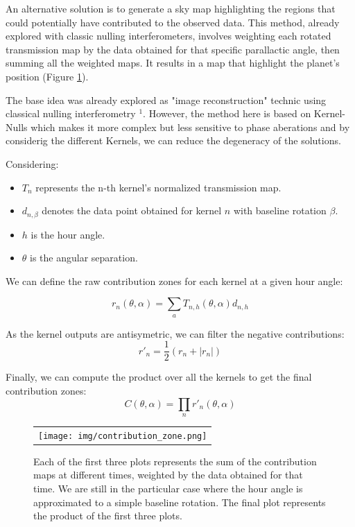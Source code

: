 \documentclass[]{spie}  %
\begin{document}
An alternative solution is to generate a sky map highlighting the regions that could potentially have contributed to the observed data. This method, already explored with classic nulling interferometers\cite{Image reconstruction}, involves weighting each rotated transmission map by the data obtained for that specific parallactic angle, then summing all the weighted maps. It results in a map that highlight the planet's position (Figure \ref{fig:contribution_zone}).

The base idea was already explored as "image reconstruction" technic using classical nulling interferometry $^1$. However, the method here is based on Kernel-Nulls which makes it more complex but less sensitive to phase aberations and by considerig the different Kernels, we can reduce the degeneracy of the solutions.

Considering:
\begin{itemize}
\item $T_{n}$ represents the n-th kernel's normalized transmission map.
\item $d_{n,\beta}$ denotes the data point obtained for kernel $n$ with baseline rotation $\beta$.
\item $h$ is the hour angle.
\item $\theta$ is the angular separation.
\end{itemize}

We can define the raw contribution zones for each kernel at a given hour angle:

\begin{equation}
    \label{eq:raw_kernel}
    r_n(\theta, \alpha) = \sum_a T_{n,h}(\theta,\alpha) d_{n,h}
\end{equation}


As the kernel outputs are antisymetric, we can filter the negative contributions:
\begin{equation}
    \label{eq:heaviside}
    r'_n = \frac{1}{2}(r_n+|r_n|)
\end{equation}


Finally, we can compute the product over all the kernels to get the final contribution zones:
\begin{equation}
    \label{eq:final}
    C(\theta, \alpha) = \prod_n r'_n(\theta, \alpha)
\end{equation}

\begin{figure}[H]
    \begin{center}
    \begin{tabular}{c}
    \texttt{[image: img/contribution\_zone.png]}
    \end{tabular}
    \end{center}
    \caption[contribution_zone] 
    {\label{fig:contribution_zone} 
    Each of the first three plots represents the sum of the contribution maps at different times, weighted by the data obtained for that time. We are still in the particular case where the hour angle is approximated to a simple baseline rotation. The final plot represents the product of the first three plots.}
\end{figure}
\end{document}
